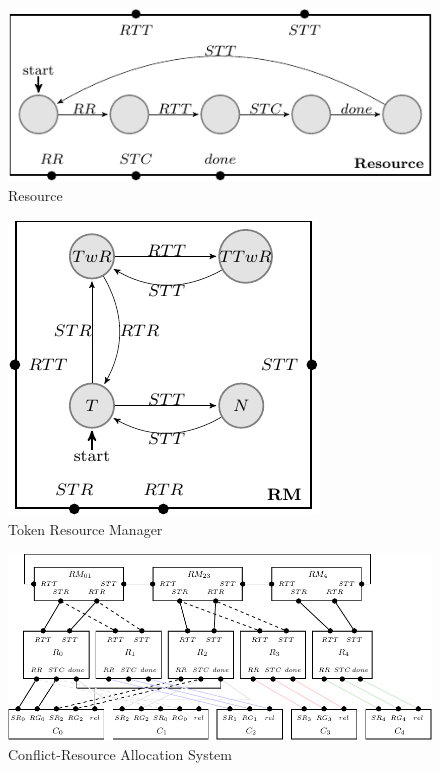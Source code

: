 \begin{figure}[ht]
\begin{center}
\includegraphics[scale=1.2]{compiledfigures/resource-crop.pdf}
\caption{Resource}
\label{fig:resourse}
\end{center}
\end{figure}

\begin{figure}[ht]
\begin{center}
\includegraphics[scale=1.2]{compiledfigures/token-crop.pdf}
\caption{Token Resource Manager}
\label{fig:conflict-token}
\end{center}
\end{figure}

\begin{figure}[ht]
\begin{center}
\includegraphics[scale=1.2]{compiledfigures/resourceallocation-crop.pdf}
\caption{Conflict-Resource Allocation System}
\label{fig:resourceallocation}
\end{center}
\end{figure}


